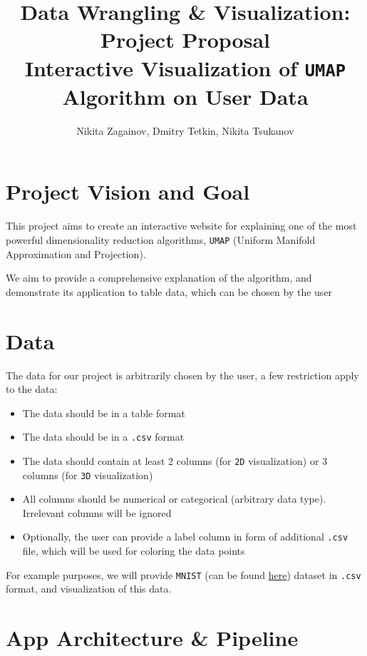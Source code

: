 \documentclass{article}
\title{Data Wrangling \& Visualization: Project Proposal \\
 \textbf{Interactive Visualization of \texttt{UMAP} Algorithm on User Data}}
\author{Nikita Zagainov, Dmitry Tetkin, Nikita Tsukanov}
\date{\monthname[\the\month] \the\year}
\begin{document}
\maketitle

\section{Project Vision and Goal}
This project aims to create an interactive website for explaining
one of the most powerful dimensionality reduction algorithms,
\texttt{UMAP} (Uniform Manifold Approximation and Projection).

\medskip

We aim to provide a comprehensive explanation of the algorithm, and
demonstrate its application to table data, which can be chosen by the
user

\section{Data}
The data for our project is arbitrarily chosen by the user, a few
restriction apply to the data:
\begin{itemize}
	\item The data should be in a table format
	\item The data should be in a \texttt{.csv} format
	\item The data should contain at least 2 columns
	      (for \texttt{2D} visualization) or 3 columns
	      (for \texttt{3D} visualization)
	\item All columns should be numerical or categorical
	      (arbitrary data type). Irrelevant columns will be ignored
	\item Optionally, the user can provide a label column in form of
	      additional \texttt{.csv} file, which will be used for coloring
	      the data points
\end{itemize}

For example purposes, we will provide \texttt{MNIST} (can be found
\href{https://pytorch.org/vision/main/generated/torchvision.datasets.MNIST.html}{here})
dataset in
\texttt{.csv} format, and visualization of this data.

\section{App Architecture \& Pipeline}
\end{document}
